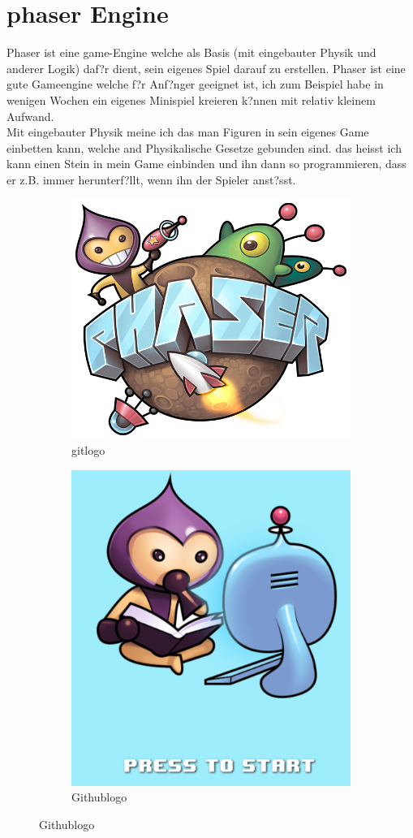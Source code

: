 \documentclass{article}
\begin{document}
\section{phaser Engine}
Phaser ist eine game-Engine welche als Basis (mit eingebauter Physik und anderer Logik) daf?r dient, sein eigenes Spiel darauf zu erstellen.
Phaser ist eine gute Gameengine welche f?r Anf?nger geeignet ist, ich zum Beispiel habe in wenigen Wochen ein eigenes Minispiel kreieren k?nnen mit
relativ kleinem Aufwand.\\
Mit eingebauter Physik meine ich das man Figuren in sein eigenes Game einbetten kann, welche and Physikalische Gesetze gebunden sind.
das heisst ich kann einen Stein in mein Game einbinden und ihn dann so programmieren, dass er z.B. immer herunterf?llt, wenn ihn der Spieler anst?sst.
\begin{figure}[ht]
\centering
\begin{subfigure}{.5\textwidth}
  \centering
  \includegraphics[width=.5\linewidth]{phaser}
  \caption{gitlogo}
  \label{fig:sub1}
\end{subfigure}%
\begin{subfigure}{.5\textwidth}
  \centering
  \includegraphics[width=.5\linewidth]{foto}
  \caption{Githublogo}
  \label{fig:sub2}
\end{subfigure}
\end{figure}
\end{document}
